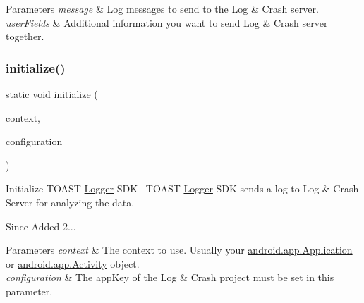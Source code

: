 \begin{DoxyParams}{Parameters}
{\em message} & Log messages to send to the Log \& Crash server. \\
\hline
{\em user\+Fields} & Additional information you want to send Log \& Crash server together. \\
\hline
\end{DoxyParams}
\mbox{\label{classcom_1_1toast_1_1android_1_1gamebase_1_1_gamebase_1_1_logger_a62178526ec645ac412196b1f4c04ae18}} 
\subsubsection{\texorpdfstring{initialize()}{initialize()}\hspace{0.1cm}{\footnotesize\ttfamily [1/2]}}
{\footnotesize\ttfamily static void initialize (\begin{DoxyParamCaption}\item[{@Non\+Null final Context}]{context,  }\item[{@Non\+Null final Logger\+Configuration}]{configuration }\end{DoxyParamCaption})\hspace{0.3cm}{\ttfamily [static]}}



Initialize T\+O\+A\+ST \hyperlink{classcom_1_1toast_1_1android_1_1gamebase_1_1_gamebase_1_1_logger}{Logger} S\+DK~\newline
 T\+O\+A\+ST \hyperlink{classcom_1_1toast_1_1android_1_1gamebase_1_1_gamebase_1_1_logger}{Logger} S\+DK sends a log to Log \& Crash Server for analyzing the data. 

\begin{DoxySince}{Since}
Added 2... 
\end{DoxySince}

\begin{DoxyParams}{Parameters}
{\em context} & The context to use. Usually your \hyperlink{}{android.\+app.\+Application}~\newline
 or \hyperlink{}{android.\+app.\+Activity} object. \\
\hline
{\em configuration} & The app\+Key of the Log \& Crash project must be set in this parameter. \\
\hline
\end{DoxyParams}
\mbox{\label{classcom_1_1toast_1_1android_1_1gamebase_1_1_gamebase_1_1_logger_abc159a53d3abd20599610a6f66e9581e}} 
